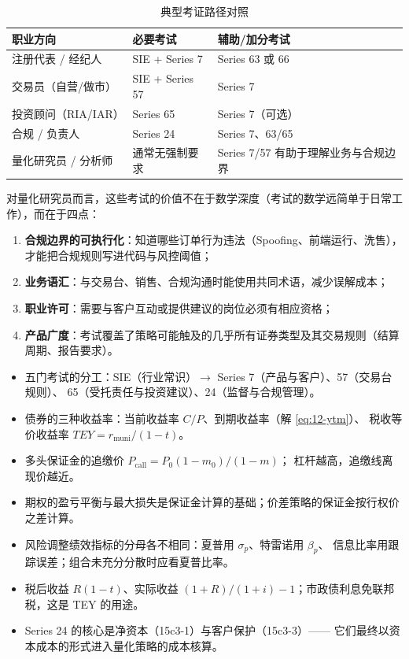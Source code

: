 \begin{table}[htbp]
\centering
\caption{典型考证路径对照}\label{tab:12-path}
\tablefont
\begin{tabular}{@{}L{3.0cm}L{3.6cm}L{4.0cm}@{}}
\toprule
\textbf{职业方向} & \textbf{必要考试} & \textbf{辅助/加分考试} \\
\midrule
注册代表 / 经纪人 & SIE + Series 7 & Series 63 或 66 \\
交易员（自营/做市） & SIE + Series 57 & Series 7 \\
投资顾问（RIA/IAR） & Series 65 & Series 7（可选） \\
合规 / 负责人 & Series 24 & Series 7、63/65 \\
量化研究员 / 分析师 & 通常无强制要求 & Series 7/57 有助于理解业务与合规边界 \\
\bottomrule
\end{tabular}
\end{table}

\begin{appbox}[量化从业者应该如何取舍]
对量化研究员而言，这些考试的价值不在于数学深度（考试的数学远简单于日常工作），而在于四点：
\begin{enumerate}[leftmargin=1.5em]
  \item \textbf{合规边界的可执行化}：知道哪些订单行为违法（Spoofing、前端运行、洗售），
        才能把合规规则写进代码与风控阈值；
  \item \textbf{业务语汇}：与交易台、销售、合规沟通时能使用共同术语，减少误解成本；
  \item \textbf{职业许可}：需要与客户互动或提供建议的岗位必须有相应资格；
  \item \textbf{产品广度}：考试覆盖了策略可能触及的几乎所有证券类型及其交易规则（结算周期、报告要求）。
\end{enumerate}
\end{appbox}

\begin{summarybox}
\begin{itemize}[leftmargin=1.4em]
  \item 五门考试的分工：SIE（行业常识）$\to$ Series 7（产品与客户）、57（交易台规则）、
        65（受托责任与投资建议）、24（监督与合规管理）。
  \item 债券的三种收益率：当前收益率 $C/P$、到期收益率（解 \cref{eq:12-ytm}）、
        税收等价收益率 $TEY = r_{\text{muni}}/(1-t)$。
  \item 多头保证金的追缴价 $P_{\text{call}} = P_0(1-m_0)/(1-m)$；
        杠杆越高，追缴线离现价越近。
  \item 期权的盈亏平衡与最大损失是保证金计算的基础；价差策略的保证金按行权价之差计算。
  \item 风险调整绩效指标的分母各不相同：夏普用 $\sigma_p$、特雷诺用 $\beta_p$、
        信息比率用跟踪误差；组合未充分分散时应看夏普比率。
  \item 税后收益 $R(1-t)$、实际收益 $(1+R)/(1+i)-1$；市政债利息免联邦税，这是 TEY 的用途。
  \item Series 24 的核心是净资本（15c3-1）与客户保护（15c3-3）——
        它们最终以资本成本的形式进入量化策略的成本核算。
\end{itemize}
\end{summarybox}

